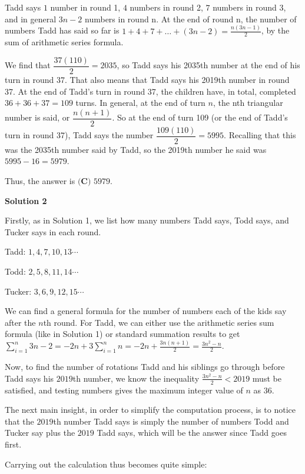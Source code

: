 \begin{enumerate}
 


 Tadd says $1$ number in round 1, $4$ numbers in round 2, $7$ numbers in round 3, and in general $3n - 2$ numbers in round n. At the end of round n, the number of numbers Tadd has said so far is $1 + 4 + 7 + \dots + (3n - 2) = \frac{n(3n-1)}{2}$, by the sum of arithmetic series formula. 

 We find that $\dfrac{37(110)}{2}=2035$, so Tadd says his 2035th number at the end of his turn in round 37. That also means that Tadd says his 2019th number in round 37. At the end of Tadd's turn in round 37, the children have, in total, completed $36+36+37=109$ turns. In general, at the end of turn $n$, the nth triangular number is said, or $\dfrac{n(n+1)}{2}$. So at the end of turn 109 (or the end of Tadd's turn in round 37), Tadd says the number $\dfrac{109(110)}{2}=5995$. Recalling that this was the 2035th number said by Tadd, so the 2019th number he said was $5995-16=5979$.

 Thus, the answer is $\boxed{\textbf{(C) }5979}$.

 



\textbf{Solution 2}

Firstly, as in Solution 1, we list how many numbers Tadd says, Todd says, and Tucker says in each round.

 Tadd: $1, 4, 7, 10, 13 \cdots$

 Todd: $2, 5, 8, 11, 14 \cdots$

 Tucker: $3, 6, 9, 12, 15 \cdots$

 We can find a general formula for the number of numbers each of the kids say after the $n$th round. For Tadd, we can either use the arithmetic series sum formula (like in Solution 1) or standard summation results to get $\sum_{i=1}^n 3n-2=-2n+3\sum_{i=1}^n n=-2n+\frac{3n(n+1)}{2}=\frac{3n^2-n}{2}$.

 Now, to find the number of rotations Tadd and his siblings go through before Tadd says his $2019$th number, we know the inequality $\frac{3n^2-n}{2}<2019$ must be satisfied, and testing numbers gives the maximum integer value of $n$ as $36$.

 The next main insight, in order to simplify the computation process, is to notice that the $2019$th number Tadd says is simply the number of numbers Todd and Tucker say plus the $2019$ Tadd says, which will be the answer since Tadd goes first.

 Carrying out the calculation thus becomes quite simple:


\end{enumerate}
